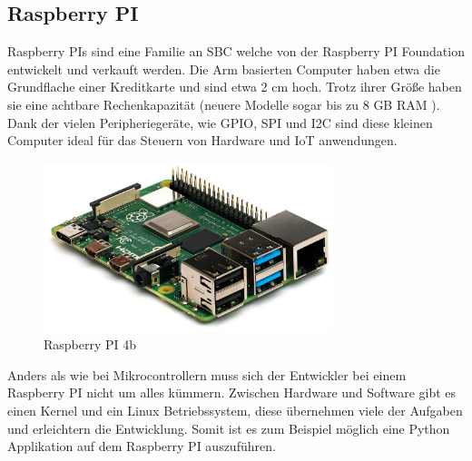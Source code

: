 ﻿\subsection{Raspberry PI}
\label{sec:raspberry_pi}

Raspberry PIs sind eine Familie an \ac{SBC} welche von der Raspberry PI Foundation entwickelt und verkauft werden. Die \ac{Arm} basierten Computer haben etwa die Grundflache einer Kreditkarte und sind etwa 2 cm hoch. Trotz ihrer Größe haben sie eine achtbare Rechenkapazität (neuere Modelle sogar bis zu 8 GB \ac{RAM} ). Dank der vielen Peripheriegeräte, wie \ac{GPIO}, \ac{SPI} und \ac{I2C} sind diese kleinen Computer ideal für das Steuern von Hardware und \ac{IoT} anwendungen.

\begin{figure}[H]
  \centering
  \includegraphics[width=0.75\textwidth]{images/raspberry_pi_4b}
  \caption{Raspberry PI 4b }
  \label{fig:raspberry_pi_4b}
\end{figure}

Anders als wie bei Mikrocontrollern muss sich der Entwickler bei einem Raspberry PI nicht um alles kümmern. Zwischen Hardware und Software gibt es einen Kernel und ein Linux Betriebssystem, diese übernehmen viele der Aufgaben und erleichtern die Entwicklung. Somit ist es zum Beispiel möglich eine Python Applikation auf dem Raspberry PI auszuführen.

